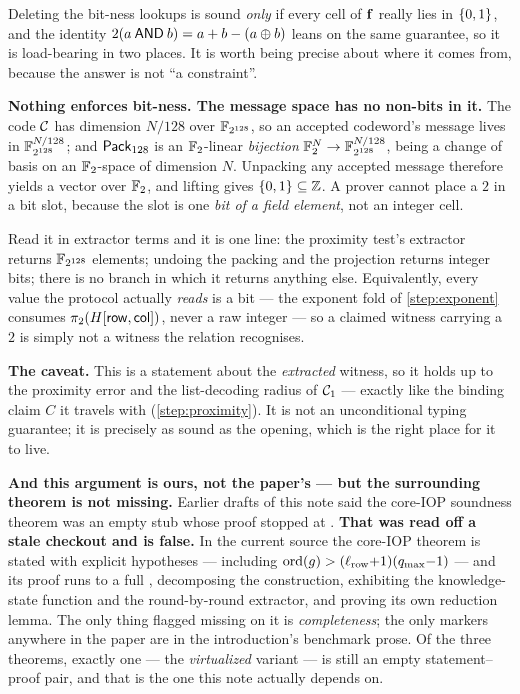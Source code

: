 \begin{warning}\label{warn:bitness}
Deleting the bit-ness lookups is sound \emph{only} if every cell of $\mathbf{f}$ really
lies in $\{0,1\}$, and the identity $2(a\mathbin{\mathsf{AND}} b)=a+b-(a\oplus b)$ leans on the same
guarantee, so it is load-bearing in two places. It is worth being precise about
where it comes from, because the answer is not ``a constraint''.

\textbf{Nothing enforces bit-ness. The message space has no non-bits in it.}
The code $\mathcal{C}$ has dimension $N/128$ over $\mathbb{F}_{2^{128}}$, so an accepted codeword's
message lives in $\mathbb{F}_{2^{128}}^{N/128}$; and $\mathsf{Pack}_{128}$ is an $\mathbb{F}_2$-linear
\emph{bijection} $\mathbb{F}_2^{N}\to\mathbb{F}_{2^{128}}^{N/128}$, being a change of basis on an
$\mathbb{F}_2$-space of dimension $N$. Unpacking any accepted message therefore yields
a vector over $\mathbb{F}_2$, and lifting gives $\{0,1\}\subseteq\mathbb{Z}$. A prover cannot
place a $2$ in a bit slot, because the slot is one \emph{bit of a field element},
not an integer cell.

Read it in extractor terms and it is one line: the proximity test's extractor
returns $\mathbb{F}_{2^{128}}$ elements; undoing the packing and the projection returns
integer bits; there is no branch in which it returns anything else. Equivalently,
every value the protocol actually \emph{reads} is a bit --- the exponent fold of
\cref{step:exponent} consumes $\pi_2(H[\mathsf{row},\mathsf{col}])$, never a raw integer --- so
a claimed witness carrying a $2$ is simply not a witness the relation
recognises.

\textbf{The caveat.} This is a statement about the \emph{extracted} witness, so
it holds up to the proximity error and the list-decoding radius of $\mathcal{C}_1$ ---
exactly like the binding claim $C$ it travels with (\cref{step:proximity}). It
is not an unconditional typing guarantee; it is precisely as sound as the
opening, which is the right place for it to live.

\textbf{And this argument is ours, not the paper's --- but the surrounding
theorem is not missing.} Earlier drafts of this note said the core-IOP soundness
theorem was an empty stub whose proof stopped at . \textbf{That was
read off a stale checkout and is false.} In the current source the core-IOP
theorem is stated with explicit hypotheses --- including
$\mathrm{ord}(g)>(\ell_{\mathrm{row}}{+}1)(q_{\max}{-}1)$ --- and its proof runs to a full
, decomposing the construction, exhibiting the
knowledge-state function and the round-by-round extractor, and proving its own
reduction lemma. The only thing flagged missing on it is
\emph{completeness}; the only  markers anywhere in the paper are in the
introduction's benchmark prose. Of the three theorems, exactly one --- the
\emph{virtualized} variant --- is still an empty statement--proof pair, and that
is the one this note actually depends on.


\end{warning}

